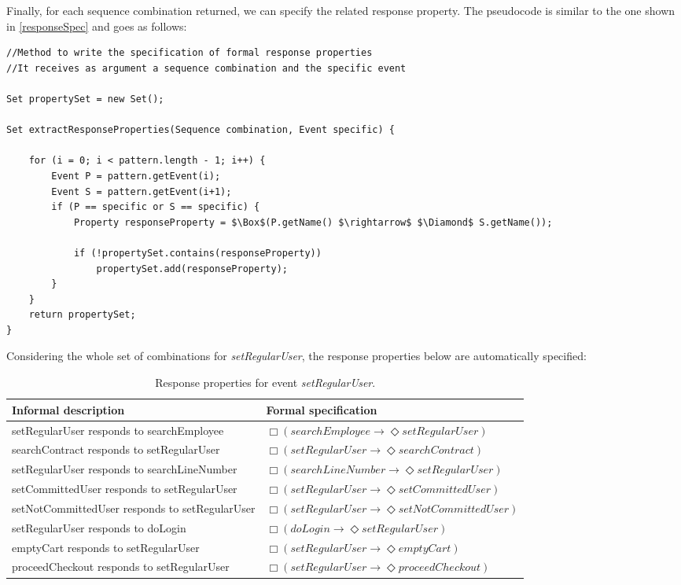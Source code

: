 Finally, for each sequence combination returned, we can specify the related response property. The pseudocode is similar to the one shown in \ref{responseSpec} and goes as follows:

\begin{lstlisting}[mathescape]
//Method to write the specification of formal response properties
//It receives as argument a sequence combination and the specific event 

Set propertySet = new Set();

Set extractResponseProperties(Sequence combination, Event specific) {

	for (i = 0; i < pattern.length - 1; i++) {
		Event P = pattern.getEvent(i);
		Event S = pattern.getEvent(i+1);
		if (P == specific or S == specific) {
			Property responseProperty = $\Box$(P.getName() $\rightarrow$ $\Diamond$ S.getName());

			if (!propertySet.contains(responseProperty))
				propertySet.add(responseProperty);
		}
	}
	return propertySet;
}
\end{lstlisting}

Considering the whole set of combinations for \textit{setRegularUser}, the response properties below are automatically specified:

\begin{table}[h]
\begin{center}
\begin{tabular}{|p{7cm}|l|}

\hline

Informal description & Formal specification \\ \hline

setRegularUser responds to searchEmployee & $\Box (searchEmployee \rightarrow \Diamond setRegularUser)$ \\ \hline
searchContract responds to setRegularUser & $\Box (setRegularUser \rightarrow \Diamond searchContract)$ \\ \hline
setRegularUser responds to searchLineNumber & $\Box (searchLineNumber \rightarrow \Diamond setRegularUser)$ \\ \hline
setCommittedUser responds to setRegularUser & $\Box (setRegularUser \rightarrow \Diamond setCommittedUser)$ \\ \hline
setNotCommittedUser responds to setRegularUser & $\Box (setRegularUser \rightarrow \Diamond setNotCommittedUser)$ \\ \hline
setRegularUser responds to doLogin & $\Box (doLogin \rightarrow \Diamond setRegularUser)$ \\ \hline
emptyCart responds to setRegularUser & $\Box (setRegularUser \rightarrow \Diamond emptyCart)$\\ \hline
proceedCheckout responds to setRegularUser & $\Box (setRegularUser \rightarrow \Diamond proceedCheckout)$ \\

\hline
\end{tabular}
\end{center}
\caption{Response properties for event \textit{setRegularUser}.}
\label{specificProperties}
\end{table}

